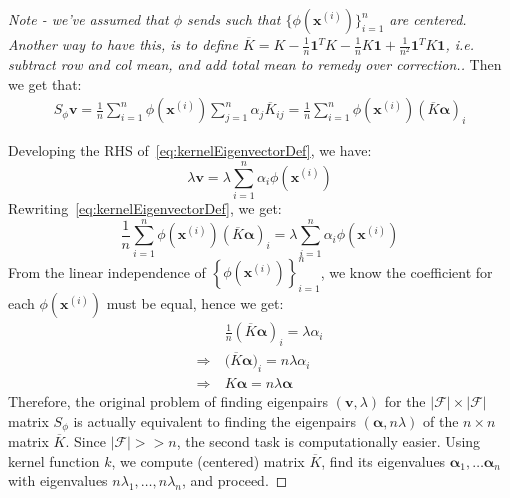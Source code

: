 \documentclass{article}
\begin{document}
\begin{theorem}
\begin{proof}
[Note - we've assumed that $\phi$ sends such that $\{  \phi(\bm{x}^{(i)}) \}_{i=1}^{n}$ are centered. Another way to have this, is to define $\overline{K} = K - \frac{1}{n}\bm{1}^{T} K - \frac{1}{n}K\bm{1} + \frac{1}{n^2} \bm{1}^{T} K \bm{1}$, i.e. subtract row and col mean, and add total mean to remedy over correction.] 

Then we get that:
\begin{align*}
  S_{\phi} \bm{v} = \frac{1}{n} \sum_{i=1}^{n} \phi (\bm{x}^{(i)}) \sum_{j=1}^{n} \alpha_{j} \overline{K}_{ij} = \frac{1}{n} \sum_{i=1}^{n} \phi(\bm{x}^{(i)}) (\overline{K} \bm{\alpha})_{i}
\end{align*}

Developing the RHS of~\cref{eq:kernelEigenvectorDef}, we have:
\[
  \lambda \bm{v} = \lambda \sum_{i=1}^{n} \alpha_i \phi(\bm{x}^{(i)})
\]
Rewriting~\cref{eq:kernelEigenvectorDef}, we get:
\[
   \frac{1}{n} \sum_{i=1}^{n} \phi(\bm{x}^{(i)}) (\overline{K} \bm{\alpha})_{i}
= \lambda \sum_{i=1}^{n} \alpha_i \phi(\bm{x}^{(i)})
\]
From the linear independence of $\left\{ \phi(\bm{x}^{(i)}) \right\}_{i=1}^{n}$, we know the coefficient for each $\phi(\bm{x}^{(i)})$ must be equal, hence we get:
\begin{align*}
  &  \frac{1}{n} (\overline{K} \bm{\alpha})_i = \lambda \alpha_i \\
  \Rightarrow \ & \big( \overline{K} \bm{\alpha} \big)_i = n \lambda \alpha_i \\
  \Rightarrow \ & K \bm{\alpha} = n \lambda \bm{\alpha}
\end{align*}
  Therefore, the original problem of finding eigenpairs $(\bm{v}, \lambda)$ for the $|\mathcal{F}| \times |\mathcal{F}|$ matrix $S_{\phi}$ is actually equivalent to finding the eigenpairs $(\bm{\alpha}, n \lambda)$ of the $n \times n$ matrix  $\overline{K}$. Since $|\mathcal{F}| >> n$, the second task is computationally easier. Using kernel function $k$, we compute (centered) matrix $\overline{K}$, find its eigenvalues $\bm{\alpha}_1, \ldots \bm{\alpha}_{n}$ with eigenvalues $n \lambda_1, \ldots, n \lambda_{n}$, and proceed. 
\end{proof}
\end{theorem}
\end{document}
